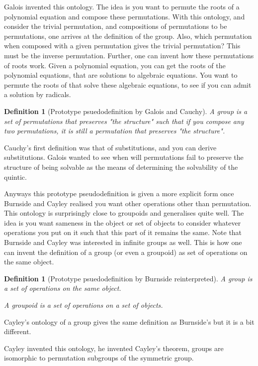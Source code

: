 \documentclass{tufte-book}
\newtheorem{definition}[theorem]{Definition}
\begin{document}
Galois invented this ontology. The idea is you want to permute the roots of a polynomial equation and compose these permutations. With this ontology, and consider the trivial permutation, and compositions of permutations to be permutations, one arrives at the definition of the group. Also, which permutation when composed with a given permutation gives the trivial permutation? This must be the inverse permutation. Further, one can invent how these permutations of roots work. Given a polynomial equation, you can get the roots of the polynomial equations, that are solutions to algebraic equations. You want to permute the roots of that solve these algebraic equations, to see if you can admit a solution by radicals.

\begin{definition}[Prototype psuedodefinition by Galois and Cauchy]
A group is a set of permutations that preserves "the structure" such that if you compose any two permutations, it is still a permutation that preserves "the structure".
\end{definition}

Cauchy's first definition was that of substitutions, and you can derive substitutions. Galois wanted to see when will permutations fail to preserve the structure of being solvable as the means of determining the solvability of the quintic.

Anyways this prototype pseudodefinition is given a more explicit form once Burnside and Cayley realised you want other operations other than permutation. This ontology is surprisingly close to groupoids and generalises quite well. The idea is you want sameness in the object or set of objects to consider whatever operations you put on it such that this part of it remains the same. Note that Burnside and Cayley was interested in infinite groups as well. This is how one can invent the definition of a group (or even a groupoid) as set of operations on the same object.

\begin{definition}[Prototype psuedodefinition by Burnside reinterpreted]
A group is a set of operations on the same object.

A groupoid is a set of operations on a set of objects.
\end{definition}

Cayley's ontology of a group gives the same definition as Burnside's but it is a bit different.

Cayley invented this ontology, he invented Cayley's theorem, groups are isomorphic to permutation subgroups of the symmetric group. 
\end{document}
